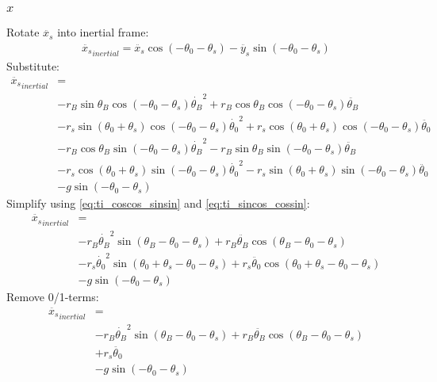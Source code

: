 \documentclass[titlepage]{article}
\numberwithin{equation}{section}
\begin{document}
\subsubsection{$x$}
Rotate $\ddot{x_s}$ into inertial frame:
\begin{align}
\ddot{x_s}_{inertial} = \ddot{x_s} \cos{(-\theta_0 - \theta_s)} - \ddot{y_s} \sin{(-\theta_0 - \theta_s)}
\end{align}
Substitute:
\begin{align}
\ddot{x_s}_{inertial} &= \nonumber \\
    &- r_B \sin \theta_B \cos{(-\theta_0 - \theta_s)} \dot{\theta_B}^2
     + r_B \cos \theta_B \cos{(-\theta_0 - \theta_s)} \ddot{\theta_B} \nonumber \\
    &- r_s \sin{(\theta_0 + \theta_s)} \cos{(-\theta_0 - \theta_s)} \dot{\theta_0}^2
     + r_s \cos{(\theta_0 + \theta_s)} \cos{(-\theta_0 - \theta_s)} \ddot{\theta_0} \nonumber \\
    &- r_B \cos \theta_B \sin{(-\theta_0 - \theta_s)} \dot{\theta_B}^2
     - r_B \sin \theta_B \sin{(-\theta_0 - \theta_s)} \ddot{\theta_B} \nonumber \\
    &- r_s \cos{(\theta_0 + \theta_s)} \sin{(-\theta_0 - \theta_s)} \dot{\theta_0}^2
     - r_s \sin{(\theta_0 + \theta_s)} \sin{(-\theta_0 - \theta_s)} \ddot{\theta_0} \nonumber \\
    &- g \sin{(-\theta_0 - \theta_s)}
\end{align}
Simplify using \ref{eq:ti_coscos_sinsin} and \ref{eq:ti_sincos_cossin}:
\begin{align}
\ddot{x_s}_{inertial} &= \nonumber \\
    &- r_B \dot{\theta_B}^2 \sin{(\theta_B - \theta_0 - \theta_s)}
     + r_B \ddot{\theta_B} \cos{(\theta_B -\theta_0 - \theta_s)} \nonumber \\
    &- r_s \dot{\theta_0}^2 \sin{(\theta_0 + \theta_s -\theta_0 - \theta_s)}
     + r_s \ddot{\theta_0} \cos{(\theta_0 + \theta_s -\theta_0 - \theta_s)} \nonumber \\
    &- g \sin{(-\theta_0 - \theta_s)}
\end{align}
Remove 0/1-terms:
\begin{align}
\ddot{x_s}_{inertial} &= \nonumber \\
    &- r_B \dot{\theta_B}^2 \sin{(\theta_B - \theta_0 - \theta_s)}
     + r_B \ddot{\theta_B} \cos{(\theta_B -\theta_0 - \theta_s)} \nonumber \\
    &+ r_s \ddot{\theta_0} \nonumber \\
    &- g \sin{(-\theta_0 - \theta_s)}
\end{align}
\end{document}
